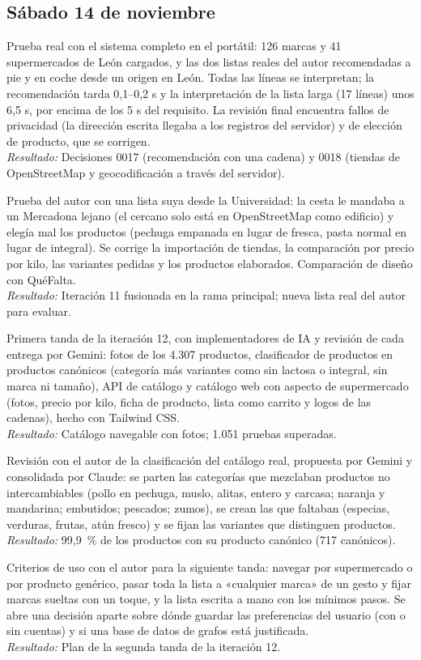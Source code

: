 \documentclass[11pt,a4paper]{article}
\newcommand{\actividad}[3]{\item[\textbf{[#1]}] #2 \\ \textit{Resultado:} #3}
\begin{document}
	\subsection*{Sábado 14 de noviembre}
	\begin{description}[leftmargin=0pt, itemsep=6pt]
		\actividad{Análisis}{Prueba real con el sistema completo en el portátil: 126 marcas y 41 supermercados de León cargados, y las dos listas reales del autor recomendadas a pie y en coche desde un origen en León. Todas las líneas se interpretan; la recomendación tarda 0,1--0,2 s y la interpretación de la lista larga (17 líneas) unos 6,5 s, por encima de los 5 s del requisito. La revisión final encuentra fallos de privacidad (la dirección escrita llegaba a los registros del servidor) y de elección de producto, que se corrigen.}{Decisiones 0017 (recomendación con una cadena) y 0018 (tiendas de OpenStreetMap y geocodificación a través del servidor).}
		\actividad{Análisis}{Prueba del autor con una lista suya desde la Universidad: la cesta le mandaba a un Mercadona lejano (el cercano solo está en OpenStreetMap como edificio) y elegía mal los productos (pechuga empanada en lugar de fresca, pasta normal en lugar de integral). Se corrige la importación de tiendas, la comparación por precio por kilo, las variantes pedidas y los productos elaborados. Comparación de diseño con QuéFalta.}{Iteración 11 fusionada en la rama principal; nueva lista real del autor para evaluar.}
		\actividad{Tarea}{Primera tanda de la iteración 12, con implementadores de IA y revisión de cada entrega por Gemini: fotos de los 4.307 productos, clasificador de productos en productos canónicos (categoría más variantes como sin lactosa o integral, sin marca ni tamaño), API de catálogo y catálogo web con aspecto de supermercado (fotos, precio por kilo, ficha de producto, lista como carrito y logos de las cadenas), hecho con Tailwind CSS.}{Catálogo navegable con fotos; 1.051 pruebas superadas.}
		\actividad{Decisión}{Revisión con el autor de la clasificación del catálogo real, propuesta por Gemini y consolidada por Claude: se parten las categorías que mezclaban productos no intercambiables (pollo en pechuga, muslo, alitas, entero y carcasa; naranja y mandarina; embutidos; pescados; zumos), se crean las que faltaban (especias, verduras, frutas, atún fresco) y se fijan las variantes que distinguen productos.}{99,9~\% de los productos con su producto canónico (717 canónicos).}
		\actividad{Análisis}{Criterios de uso con el autor para la siguiente tanda: navegar por supermercado o por producto genérico, pasar toda la lista a «cualquier marca» de un gesto y fijar marcas sueltas con un toque, y la lista escrita a mano con los mínimos pasos. Se abre una decisión aparte sobre dónde guardar las preferencias del usuario (con o sin cuentas) y si una base de datos de grafos está justificada.}{Plan de la segunda tanda de la iteración 12.}

\end{description}
\end{document}
